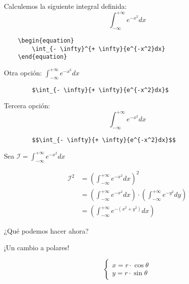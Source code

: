 \begin{frame}[fragile]
    Calculemos la siguiente integral definida:
    \begin{equation*}
        \int_{- \infty}^{+ \infty}{e^{-x^2}dx}
    \end{equation*}
    \begin{verbatim}
    \begin{equation}
        \int_{- \infty}^{+ \infty}{e^{-x^2}dx}
    \end{equation}
    \end{verbatim}
    Otra opción: $\int_{- \infty}^{+ \infty}{e^{-x^2}dx}$
    \begin{verbatim}
        $\int_{- \infty}{+ \infty}{e^{-x^2}dx}$
    \end{verbatim}
    Tercera opción: $$\int_{- \infty}^{+ \infty}{e^{-x^2}dx}$$
    \begin{verbatim}
        $$\int_{- \infty}{+ \infty}{e^{-x^2}dx}$$
    \end{verbatim}
\end{frame}

\begin{frame}[fragile]
    \begin{center}
    Sea $\mathcal{I} = \int_{- \infty}^{+ \infty}{e^{-x^2}dx}$
    \end{center}
    \begin{align*}
        \mathcal{I}^2 &= \left ( \int_{- \infty}^{+ \infty}{e^{-x^2}dx} \right )^2 \\
        &= \left ( \int_{- \infty}^{+ \infty}{e^{-x^2}dx} \right ) \cdot \left ( \int_{- \infty}^{+ \infty}{e^{-y^2}dy} \right ) \\
        &= \left ( \int_{- \infty}^{+ \infty}{e^{-(x^2 + y^2)}dx} \right )
    \end{align*}
    \begin{center}
    ¿Qué podemos hacer ahora?
    \end{center}
    \begin{center}
    ¡Un cambio a polares!
    \end{center}
    $$
    \begin{cases}
        x = r \cdot \cos{\theta} \\
        y = r \cdot \sin{\theta}
    \end{cases}
    $$
\end{frame}

